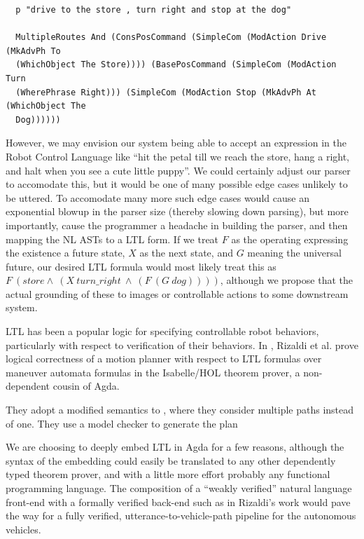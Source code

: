\documentclass[a4paper, 11pt]{article}
\begin{document}
\begin{verbatim}
  p "drive to the store , turn right and stop at the dog"

  MultipleRoutes And (ConsPosCommand (SimpleCom (ModAction Drive (MkAdvPh To
  (WhichObject The Store)))) (BasePosCommand (SimpleCom (ModAction Turn
  (WherePhrase Right))) (SimpleCom (ModAction Stop (MkAdvPh At (WhichObject The
  Dog))))))
\end{verbatim}

However, we may envision our system being able to accept an expression in the
Robot Control Language like ``hit the petal till we reach the store, hang a
right, and halt when you see a cute little puppy''. We could certainly adjust
our parser to accomodate this, but it would be one of many possible edge cases
unlikely to be uttered. To accomodate many more such edge cases would cause an
exponential blowup in the parser size (thereby slowing down parsing), but more
importantly, cause the programmer a headache in building the parser, and then
mapping the NL ASTs to a LTL form. If we treat $F$ as the operating
expressing the existence a future state, $X$ as the next state, and $G$ meaning
the universal future, our desired LTL formula would most likely treat this as
$F\ (store \land\ (X\ turn\_right\ \land\ (F\ (G\ dog))))$, although we propose
that the actual grounding of these to images or controllable actions to some
downstream system.

LTL has been a popular logic for specifying controllable robot behaviors,
particularly with respect to verification of their behaviors. In
\cite{verifiedMotion}, Rizaldi et al. prove logical correctness of a motion
planner with respect to LTL formulas over maneuver automata formulas in the
Isabelle/HOL theorem prover, a non-dependent cousin of Agda.

They adopt a
modified semantics to \cite{fainekos2005temporal}, where they consider multiple
paths instead of one. They use a model checker to generate the plan

We are choosing to
deeply embed LTL in Agda for a few reasons, although the syntax of the embedding
could easily be translated to any other dependently typed theorem prover, and
with a little more effort probably any functional programming language. The
composition of a ``weakly verified'' natural language front-end with a formally
verified back-end such as in Rizaldi's work would pave the way for a fully
verified, utterance-to-vehicle-path pipeline for the autonomous vehicles.
\end{document}
